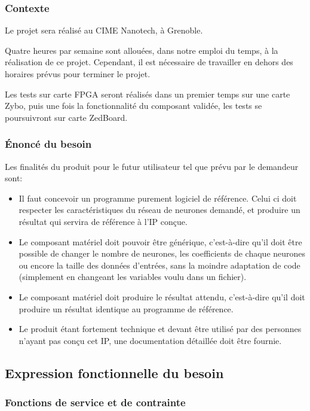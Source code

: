 \subsubsection{Contexte}

Le projet sera réalisé au CIME Nanotech, à Grenoble. 

Quatre heures par semaine sont allouées, dans notre emploi du temps, à la réalisation de ce projet. Cependant,
il est nécessaire de travailler en dehors des horaires prévus pour terminer 
le projet.

Les tests sur carte FPGA seront réalisés dans un premier temps sur une carte Zybo,
puis une fois la fonctionnalité du composant validée, les tests se poursuivront 
sur carte ZedBoard.

\subsubsection{Énoncé du besoin}

Les finalités du produit pour le futur utilisateur tel que prévu par le
demandeur sont:
\begin{itemize}
	\item Il faut concevoir un programme purement logiciel de référence. 
		Celui ci doit respecter les caractéristiques du réseau de neurones demandé, et produire un résultat qui servira de référence à l'IP conçue.
	\item Le composant matériel doit pouvoir être générique, 
		c'est-à-dire qu'il doit être possible de changer le nombre de
		neurones, les coefficients de chaque neurones
		ou encore la taille des données d'entrées, 
		sans la moindre adaptation de code (simplement en changeant les variables voulu dans un fichier).
	\item Le composant matériel doit produire le résultat attendu, c'est-à-dire qu'il
		doit produire un résultat identique au programme de référence.
	\item Le produit étant fortement technique et devant être utilisé par des personnes n'ayant pas conçu cet IP, une documentation détaillée doit être fournie.
\end{itemize}

\subsection{Expression fonctionnelle du besoin}

\subsubsection{Fonctions de service et de contrainte}

